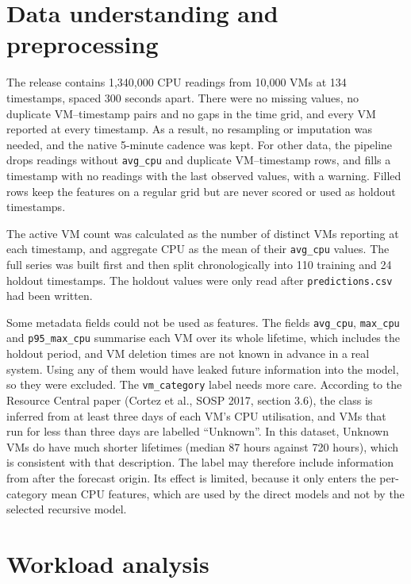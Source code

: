 \documentclass[11pt,a4paper]{article}
\newcommand{\m}[1]{\texttt{#1}}
\begin{document}
\section{Data understanding and preprocessing}

The release contains 1,340,000 CPU readings from 10,000 VMs at 134 timestamps, spaced 300 seconds apart. There were no missing values, no duplicate VM--timestamp pairs and no gaps in the time grid, and every VM reported at every timestamp. As a result, no resampling or imputation was needed, and the native 5-minute cadence was kept. For other data, the pipeline drops readings without \m{avg\_cpu} and duplicate VM--timestamp rows, and fills a timestamp with no readings with the last observed values, with a warning. Filled rows keep the features on a regular grid but are never scored or used as holdout timestamps.

The active VM count was calculated as the number of distinct VMs reporting at each timestamp, and aggregate CPU as the mean of their \m{avg\_cpu} values. The full series was built first and then split chronologically into 110 training and 24 holdout timestamps. The holdout values were only read after \m{predictions.csv} had been written.

Some metadata fields could not be used as features. The fields \m{avg\_cpu}, \m{max\_cpu} and \m{p95\_max\_cpu} summarise each VM over its whole lifetime, which includes the holdout period, and VM deletion times are not known in advance in a real system. Using any of them would have leaked future information into the model, so they were excluded. The \m{vm\_category} label needs more care. According to the Resource Central paper (Cortez et al., SOSP 2017, section 3.6), the class is inferred from at least three days of each VM's CPU utilisation, and VMs that run for less than three days are labelled ``Unknown''. In this dataset, Unknown VMs do have much shorter lifetimes (median 87 hours against 720 hours), which is consistent with that description. The label may therefore include information from after the forecast origin. Its effect is limited, because it only enters the per-category mean CPU features, which are used by the direct models and not by the selected recursive model.

\section{Workload analysis}
\end{document}
